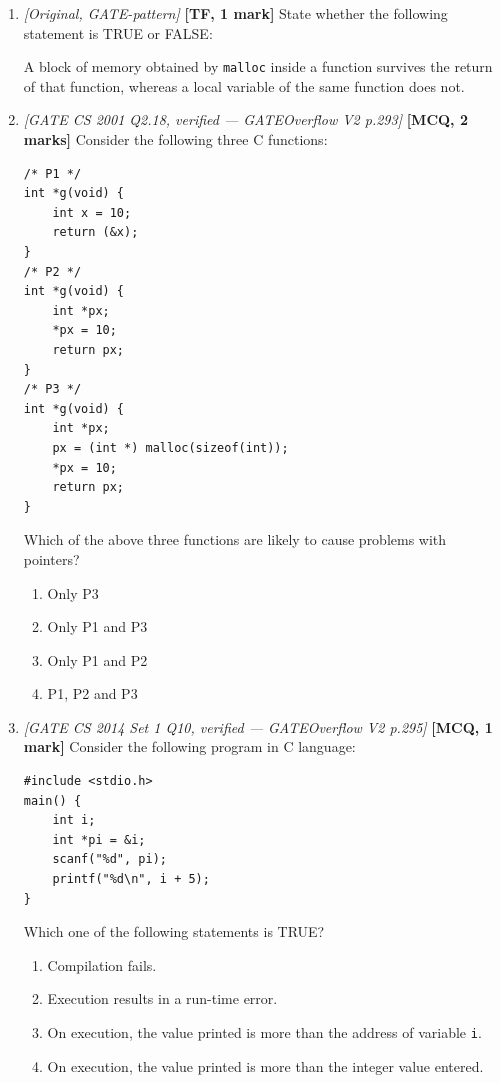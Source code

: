 \documentclass[11pt]{article}
\begin{document}
\begin{enumerate}
\item[\textbf{Q4}] \textit{[Original, GATE-pattern]} \textbf{[TF, 1 mark]} State whether the following statement is TRUE or FALSE:

A block of memory obtained by \texttt{malloc} inside a function survives the return of that function, whereas a local variable of the same function does not.

\item[\textbf{Q5}] \textit{[GATE CS 2001 Q2.18, verified --- GATEOverflow V2 p.293]} \textbf{[MCQ, 2 marks]} Consider the following three C functions:
\begin{verbatim}
/* P1 */
int *g(void) {
    int x = 10;
    return (&x);
}
/* P2 */
int *g(void) {
    int *px;
    *px = 10;
    return px;
}
/* P3 */
int *g(void) {
    int *px;
    px = (int *) malloc(sizeof(int));
    *px = 10;
    return px;
}
\end{verbatim}
Which of the above three functions are likely to cause problems with pointers?
\begin{enumerate}
  \item[(A)] Only P3
  \item[(B)] Only P1 and P3
  \item[(C)] Only P1 and P2
  \item[(D)] P1, P2 and P3
\end{enumerate}

\item[\textbf{Q6}] \textit{[GATE CS 2014 Set 1 Q10, verified --- GATEOverflow V2 p.295]} \textbf{[MCQ, 1 mark]} Consider the following program in C language:
\begin{verbatim}
#include <stdio.h>
main() {
    int i;
    int *pi = &i;
    scanf("%d", pi);
    printf("%d\n", i + 5);
}
\end{verbatim}
Which one of the following statements is TRUE?
\begin{enumerate}
  \item[(A)] Compilation fails.
  \item[(B)] Execution results in a run-time error.
  \item[(C)] On execution, the value printed is more than the address of variable \texttt{i}.
  \item[(D)] On execution, the value printed is more than the integer value entered.
\end{enumerate}


\end{enumerate}
\end{document}
